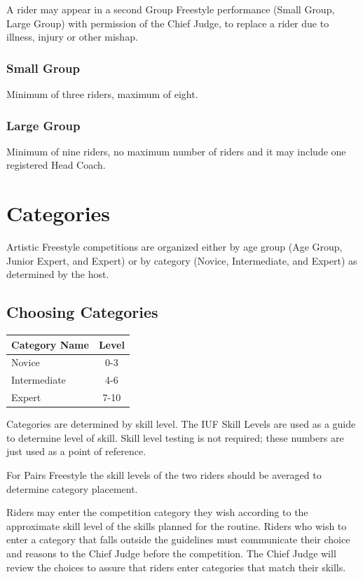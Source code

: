 A rider may appear in a second Group Freestyle performance (Small Group, Large Group) with permission of the Chief Judge, to replace a rider due to illness, injury or other mishap.

\subsubsection{Small Group}
Minimum of three riders, maximum of eight.

\subsubsection{Large Group}
Minimum of nine riders, no maximum number of riders and it may include one registered Head Coach.

\section{Categories}

Artistic Freestyle competitions are organized either by age group (Age Group, Junior Expert, and Expert) or by category (Novice, Intermediate, and Expert) as determined by the host.

\subsection{Choosing Categories \label{subsec:freestyle-choosing_categories}}

\begin{tabular}{|l|c|}
\hline
\textbf{Category Name} & \textbf{Level} \\
\hline
Novice & 0-3 \\
\hline
Intermediate & 4-6 \\
\hline
Expert & 7-10 \\
\hline
\end{tabular}

Categories are determined by skill level.
The IUF Skill Levels are used as a guide to determine level of skill.
Skill level testing is not required; these numbers are just used as a point of reference.

For Pairs Freestyle the skill levels of the two riders should be averaged to determine category placement.

Riders may enter the competition category they wish according to the approximate skill
level of the skills planned for the routine.
Riders who wish to enter a category that falls outside the guidelines must communicate their choice and reasons to the Chief Judge before the competition.
The Chief Judge will review the choices to assure that riders enter categories that match their skills.

